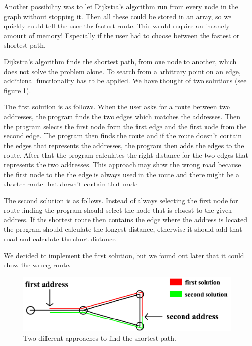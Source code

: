 \documentclass[a4paper,10pt,titlepage]{article}
\begin{document}
Another possibility was to let Dijkstra’s algorithm run from every node in the graph without stopping it. Then all these could be stored in an array, so we quickly could tell the user the fastest route. This would require an insanely amount of memory! Especially if the user had to choose between the fastest or shortest path.

Dijkstra's algorithm finds the shortest path, from one node to another, which does not solve the problem alone. To search from a arbitrary point on an edge, additional functionality has to be applied. We have thought of two solutions (see figure \ref{fig:routeFinding}). 

The first solution is as follows. When the user asks for a route between two addresses, the program finds the two edges which matches the addresses. Then the program selects the first node from the first edge and the first node from the second edge. The program then finds the route and if the route doesn't contain the edges that represents the addresses, the program then adds the edges to the route. After that the program calculates the right distance for the two edges that represents the two addresses.  This approach may show the wrong road because the first node to the the edge is always used in the route and there might be a shorter route that doesn't contain that node. 

The second solution is as follows. Instead of always selecting the first node for route finding the program should select the node that is closest to the given address. If the shortest route then contains the edge where the address is located the program should calculate the longest distance, otherwise it should add that road and calculate the short distance.

We decided to implement the first solution, but we found out later that it could show the wrong route. \\

\begin{figure}[H]
\includegraphics[width=120mm]{routeFinding.png}
\caption{Two different approaches to find the shortest path.}
\label{fig:routeFinding}
\end{figure}
\end{document}
